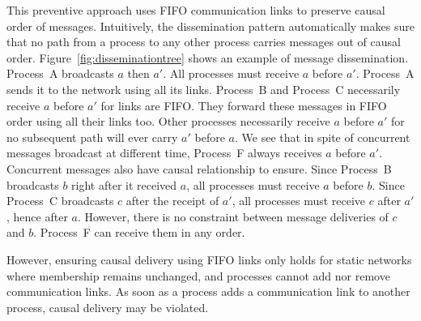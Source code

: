 This preventive approach uses FIFO communication links to preserve causal order
of messages. Intuitively, the dissemination pattern automatically makes sure
that no path from a process to any other process carries messages out of causal
order. Figure~\ref{fig:disseminationtree} shows an example of message
dissemination. Process~A broadcasts $a$ then $a'$. All processes must receive
$a$ before $a'$. Process~A sends it to the network using all its
links. Process~B and Process~C necessarily receive $a$ before $a'$ for links are
FIFO. They forward these messages in FIFO order using all their links too.
Other processes necessarily receive $a$ before $a'$ for no subsequent path will
ever carry $a'$ before $a$.  We see that in spite of concurrent messages
broadcast at different time, Process~F always receives $a$ before
$a'$. Concurrent messages also have causal relationship to ensure.  Since
Process~B broadcasts $b$ right after it received $a$, all processes must receive
$a$ before $b$. Since Process~C broadcasts $c$ after the receipt of $a'$, all
processes must receive $c$ after $a'$, hence after $a$. However, there is no
constraint between message deliveries of $c$ and $b$. Process~F can receive them
in any order.


%     



However, ensuring causal delivery using FIFO links only holds for static
networks where membership remains unchanged, and processes cannot add nor remove
communication links. As soon as a process adds a communication link to another
process, causal delivery may be violated.

